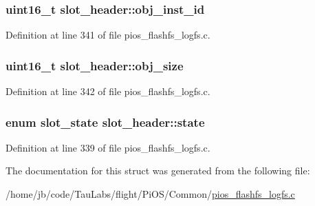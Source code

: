 \hypertarget{structslot__header_a61928fad0e752c278fb8485aa199240d}{
\subsubsection[{obj\-\_\-inst\-\_\-id}]{\setlength{\rightskip}{0pt plus 5cm}uint16\-\_\-t {\bf slot\-\_\-header\-::obj\-\_\-inst\-\_\-id}}}\label{structslot__header_a61928fad0e752c278fb8485aa199240d}


\-Definition at line 341 of file pios\-\_\-flashfs\-\_\-logfs.\-c.

\hypertarget{structslot__header_ada9f3086c54142732ee8e98e88a65d3a}{
\subsubsection[{obj\-\_\-size}]{\setlength{\rightskip}{0pt plus 5cm}uint16\-\_\-t {\bf slot\-\_\-header\-::obj\-\_\-size}}}\label{structslot__header_ada9f3086c54142732ee8e98e88a65d3a}


\-Definition at line 342 of file pios\-\_\-flashfs\-\_\-logfs.\-c.

\hypertarget{structslot__header_a5bfcf2f73ad00e1f416dd3b9a557b7a3}{
\subsubsection[{state}]{\setlength{\rightskip}{0pt plus 5cm}enum {\bf slot\-\_\-state} {\bf slot\-\_\-header\-::state}}}\label{structslot__header_a5bfcf2f73ad00e1f416dd3b9a557b7a3}


\-Definition at line 339 of file pios\-\_\-flashfs\-\_\-logfs.\-c.



\-The documentation for this struct was generated from the following file\-:\begin{DoxyCompactItemize}
\item 
/home/jb/code/\-Tau\-Labs/flight/\-Pi\-O\-S/\-Common/\hyperlink{pios__flashfs__logfs_8c}{pios\-\_\-flashfs\-\_\-logfs.\-c}\end{DoxyCompactItemize}
